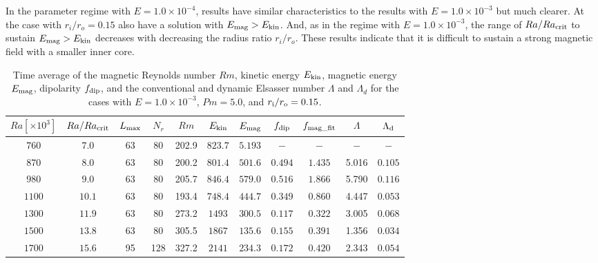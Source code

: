 {\color{blue}
In the parameter regime with $E = 1.0 \times 10^{-4}$, results have similar characteristics to the results with $E = 1.0 \times 10^{-3}$ but {\color{red} much} clearer.
At the case with $r_i/r_o = 0.15$ also have a solution with $E_{\rm mag} > E_{\rm kin}$. And, as in the regime with $E = 1.0 \times 10^{-3}$, the range of $Ra / Ra_{\rm crit}$ to sustain $E_{\rm mag} > E_{\rm kin}$ decreases with decreasing the radius ratio $r_i / r_o$.
}
{\color{red}
These results indicate that it is difficult to sustain a strong magnetic field with a smaller inner core.
}
%
\begin{table}
\caption{Time average of the magnetic Reynolds number $Rm$, kinetic energy $E_{\rm kin}$, magnetic energy $E_{\rm mag}$, dipolarity $f_{\rm dip}$, and {\color{red} the conventional and dynamic Elsasser number $\Lambda$ and $\Lambda_{d}$ for the cases with $E = 1.0 \times 10^{-3}$, $Pm = 5.0$, and} $r_{\rm i}/r_{\rm o} = 0.15$.}
  \begin{tabular}{ccccccccccc}
      \hline
     $Ra[\times 10^3]$  &  $Ra/Ra_{\rm crit}$&
     {\color{red} $L_{\rm max}$} & {\color{red} $N_{r}$} & {\color{red} $Rm$} & $E_{\rm kin}$  &  $E_{\rm mag}$ & $f_{\rm dip}$ & $f_{\rm mag\_fit}$ & $\Lambda$ & $\Lambda_{\rm d}$\\
    \hline
    $760$  & $7.0$ & 63 & 80 &  202.9 & $823.7$ & $5.193$ & $-$ & $-$ & $-$ & $-$ \\
    $870$  & $8.0$ & 63 & 80 &  200.2 & $801.4$ & $501.6$ & $0.494$ & $1.435$ & 5.016 & $0.105$\\
    $980$  & $9.0$ & 63 & 80 &  205.7 & $846.4$ & $579.0$ & $0.516$ & $1.866$ & 5.790 & $0.116$\\
    $1100$  & $10.1$ & 63 & 80 &  193.4 & $748.4$ & $444.7$ & $0.349$ & $0.860$ & 4.447  & $0.053$\\
    $1300$  & $11.9$ & 63 & 80 &  273.2 & $1493$ & $300.5$ & $0.117$ & $0.322$ & 3.005 & $0.068$\\
    $1500$  & $13.8$ & 63 & 80 &  305.5 & $1867$ & $135.6$ & $0.155$ & $0.391$ & 1.356 & $0.034$\\
    $1700$  & $15.6$ & 95 & 128 & 327.2 & $2141$ & $234.3$ & $0.172$ & $0.420$ & 2.343 & $0.054$\\
     \hline
  \end{tabular}
 \label{table:Summary_15}
 \end{table}
 

